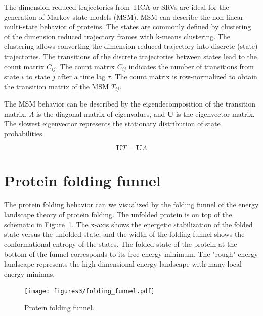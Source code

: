 The dimension reduced trajectories from TICA or SRVs are ideal for the generation of Markov state models (MSM)\cite{Noe2015}. MSM can describe the non-linear multi-state behavior of proteins. The states are commonly defined by clustering of the dimension reduced trajectory frames with k-means clustering. The clustering allows converting the dimension reduced trajectory into discrete (state) trajectories. The transitions of the discrete trajectories between states lead to the count matrix $C_{ij}$. The count matrix $C_{ij}$ indicates the number of transitions from state $i$ to state $j$ after a time lag $\tau$. The count matrix is row-normalized to obtain the transition matrix of the MSM $T_{ij}$.

The MSM behavior can be described by the eigendecomposition of the transition matrix. $\varLambda$ is the diagonal matrix of eigenvalues, and $\mathbf{U}$ is the eigenvector matrix. The slowest eigenvector represents the stationary distribution of state probabilities.

$$\mathbf{U}T=\mathbf{U}\varLambda$$


\section{Protein folding funnel}

The protein folding behavior can we visualized by the folding funnel of the energy landscape theory of protein folding\cite{bryngelson1995p}. The unfolded protein is on top of the schematic in Figure~\ref{fig:funnel}. The x-axis shows the energetic stabilization of the folded state versus the unfolded state, and the width of the folding funnel shows the conformational entropy of the states.  The folded state of the protein at the bottom of the funnel corresponds to its free energy minimum. The "rough" energy landscape represents the high-dimensional energy landscape with many local energy minimas.

\begin{figure}[H]
  \centering
  \texttt{[image: figures3/folding\_funnel.pdf]}
  \caption{Protein folding funnel.}
  \label{fig:funnel}
\end{figure}



